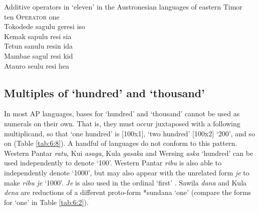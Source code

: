 \let\eachwordone=\rm
\let\eachwordtwo=\it
\let\eachwordthree=\it
\let\eachwordfour=\it
\let\eachwordfive=\it 
\let\eachwordsix\it 

\ea%
\label{ex:6:16}
Additive operators in `eleven' in the Austronesian languages of eastern Timor\\
\gllllll {}  ten    O\textsc{perator}    one  \\
{\rm Tokodede}    sagulu  geresi    iso           \\
{\rm Kemak}     sapulu  resi    sia           \\
{\rm Tetun}    sanulu  resin    ida           \\
{\rm Mambae}    sagul    resi    kid           \\
{\rm Atauro}    se{\ng}ulu  resi    hea           \\
\z

      
\let\eachwordone=\it
\let\eachwordtwo=\rm
\let\eachwordthree=\rm
\let\eachwordfour=\rm
\let\eachwordfive=\rm 
\let\eachwordsix=\rm   







\subsection{Multiples of `hundred' and `thousand'} \label{sec:6:6.3}
In most AP languages, bases for `hundred' and `thousand' cannot be used as numerals on their own. That is, they must occur juxtaposed with a following multiplicand, so that `one hundred' is [100x1], `two hundred' [100x2] `200', and so on (Table \ref{tab:6:8}). A handful of languages do not conform to this pattern. Western Pantar \textit{ratu}, Kui \textit{asaga}, Kula \textit{gasaka} and Wersing \textit{aska} `hundred' can be used independently to denote `100'. Western Pantar \textit{ribu} is also able to independently denote `1000', but may also appear with the unrelated form \textit{je} to make \textit{ribu je} `1000'. \textit{Je} is also used in the ordinal `first' \citep{KlamerSchapperCorbettTVnumeralwords}. Sawila \textit{dana} and Kula \textit{dena} are reductions of a different proto-form *sundana `one' (compare the forms for `one' in Table \ref{tab:6:2}).


